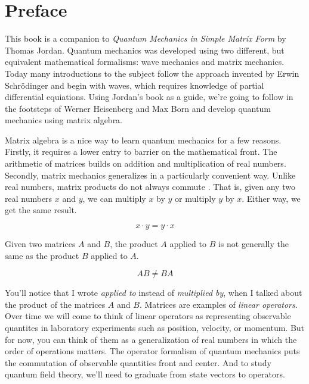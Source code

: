 \chapter{Preface}

This book is a companion to \emph{Quantum Mechanics in Simple Matrix Form} \cite{Jordan2005} by Thomas Jordan. Quantum mechanics was developed using two different, but equivalent mathematical formalisms: wave mechanics and matrix mechanics. Today many introductions to the subject follow the approach invented by Erwin Schr\"odinger and begin with waves, which requires knowledge of partial differential equiations. Using Jordan's book as a guide, we're going to follow in the footsteps of Werner Heisenberg and Max Born and develop quantum mechanics using matrix algebra.

Matrix algebra is a nice way to learn quantum mechanics for a few reasons. Firstly, it requires a lower entry to barrier on the mathematical front. The arithmetic of matrices builds on addition and multiplication of real numbers. Secondly, matrix mechanics generalizes in a particularly convenient way. Unlike real numbers, matrix products do not always commute . That is, given any two real numbers $x$ and $y$, we can multiply $x$ by $y$ or multiply $y$ by $x$. Either way, we get the same result.

$$ x\cdot y = y \cdot x $$

Given two matrices $A$ and $B$, the product $A$ applied to $B$ is not generally the same as the product $B$ applied to $A$.

$$ AB \neq BA $$

You'll notice that I wrote \emph{applied to} instead of \emph{multiplied by}, when I talked about the product of the matrices $A$ and $B$. Matrices are examples of \emph{linear operators}. Over time we will come to think of linear operators as representing observable quantites in laboratory experiments such as position, velocity, or momentum. But for now, you can think of them as a generalization of real numbers in which the order of operations matters. The operator formalism of quantum mechanics puts the commutation of observable quantities front and center. And to study quantum field theory, we'll need to graduate from state vectors to operators.

